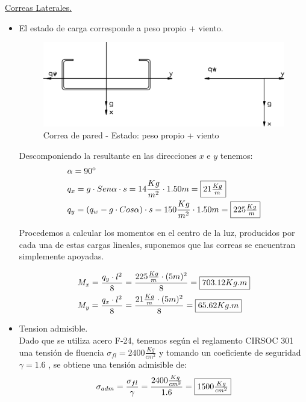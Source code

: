 \item \underline{Correas Laterales.}\\
\begin{itemize}

\item El estado de carga corresponde a peso propio + viento.

\begin{figure}[H]
\begin{center}
     \includegraphics[scale = 1]{chapters/chapter_3/images/figura5.png}
\caption{Correa de pared - Estado: peso propio + viento}
\end{center}
\end{figure}

Descomponiendo la resultante en las direcciones $x$ e $y$ tenemos:
\begin{align*}
& \alpha = 90 \textsuperscript{o}\\
& q_x=g \cdot Sen \alpha \cdot s = 14 \frac{Kg}{m^2} \cdot 1.50m= \framebox{$21 \frac{Kg}{m}$}\\
& q_y=(q_w - g \cdot Cos \alpha) \cdot s = 150 \frac{Kg}{m^2} \cdot 1.50m= \framebox{$225 \frac{Kg}{m}$}
\end{align*}

Procedemos a calcular los momentos en el centro de la luz, producidos por cada una de estas cargas lineales, suponemos que las correas se encuentran simplemente apoyadas.

\begin{align*}
& M_x= \frac{q_y \cdot l^2}{8} = \frac{225 \frac{Kg}{m} \cdot (5m)^2}{8} = \framebox{$703.12 Kg.m$} \\
& M_y= \frac{q_x \cdot l^2}{8} = \frac{21 \frac{Kg}{m} \cdot (5m)^2}{8} = \framebox{$65.62 Kg.m$}
\end{align*}

\item Tension admisible.\\
Dado que se utiliza acero F-24, tenemos según el reglamento CIRSOC 301 una tensión de fluencia $\sigma_{fl}=2400 \frac{Kg}{cm^2}$ y tomando un coeficiente de seguridad $\gamma = 1.6$ , se obtiene una tensión admisible de:
$$\sigma_{adm}= \frac{\sigma_{fl}}{\gamma} = \frac{2400 \frac{Kg}{cm^2}}{1.6} = \framebox{$1500 \frac{Kg}{cm^2}$}$$


\end{itemize}

